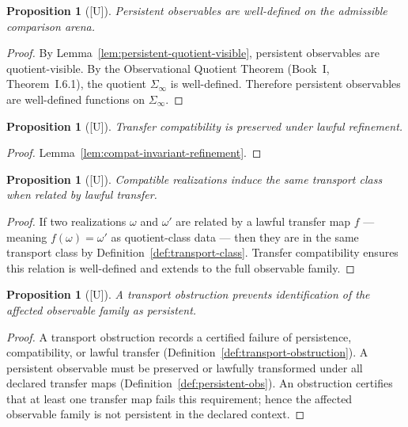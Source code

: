 \documentclass[12pt,oneside]{amsbook}
\theoremstyle{plain}
\newtheorem{proposition}[theorem]{Proposition}
\theoremstyle{definition}
\theoremstyle{remark}
\newcommand{\status}[1]{\textup{[#1]}}
\begin{document}
\begin{proposition}[\status{U}]\label{prop:persistent-obs-arena}
Persistent observables are well-defined on the admissible comparison
arena.
\end{proposition}

\begin{proof}
By Lemma~\ref{lem:persistent-quotient-visible}, persistent
observables are quotient-visible.  By the Observational Quotient
Theorem (Book~I, Theorem~I.6.1), the quotient $\Sigma_\infty$ is
well-defined.  Therefore persistent observables are well-defined
functions on $\Sigma_\infty$.
\end{proof}

\begin{proposition}[\status{U}]\label{prop:compat-preserved-refinement}
Transfer compatibility is preserved under lawful refinement.
\end{proposition}

\begin{proof}
Lemma~\ref{lem:compat-invariant-refinement}.
\end{proof}

\begin{proposition}[\status{U}]\label{prop:compatible-transport-class}
Compatible realizations induce the same transport class when related
by lawful transfer.
\end{proposition}

\begin{proof}
If two realizations $\omega$ and $\omega'$ are related by a lawful
transfer map $f$ --- meaning $f(\omega) = \omega'$ as quotient-class
data --- then they are in the same transport class by
Definition~\ref{def:transport-class}.  Transfer compatibility ensures
this relation is well-defined and extends to the full observable
family.
\end{proof}

\begin{proposition}[\status{U}]\label{prop:obstruction-blocks-persistence}
A transport obstruction prevents identification of the affected
observable family as persistent.
\end{proposition}

\begin{proof}
A transport obstruction records a certified failure of persistence,
compatibility, or lawful transfer
(Definition~\ref{def:transport-obstruction}).  A persistent observable
must be preserved or lawfully transformed under all declared transfer
maps (Definition~\ref{def:persistent-obs}).  An obstruction certifies
that at least one transfer map fails this requirement; hence the
affected observable family is not persistent in the declared context.
\end{proof}
\end{document}
